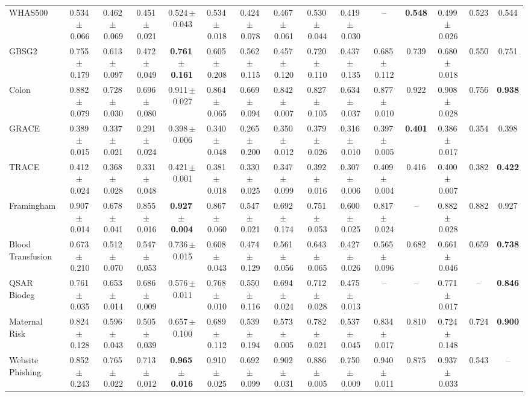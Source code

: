 \documentclass[8pt]{extarticle}
\begin{document}
\begin{longtable}{l*{14}{c}}
WHAS500 & 0.534\,$\pm$\,0.066 & 0.462\,$\pm$\,0.069 & 0.451\,$\pm$\,0.021 & 0.524\,$\pm$\,0.043 & 0.534\,$\pm$\,0.018 & 0.424\,$\pm$\,0.078 & 0.467\,$\pm$\,0.061 & 0.530\,$\pm$\,0.044 & 0.419\,$\pm$\,0.030 & -- & \textbf{0.548} & 0.499\,$\pm$\,0.026 & 0.523 & 0.544 \\
GBSG2 & 0.755\,$\pm$\,0.179 & 0.613\,$\pm$\,0.097 & 0.472\,$\pm$\,0.049 & \textbf{0.761\,$\pm$\,0.161} & 0.605\,$\pm$\,0.208 & 0.562\,$\pm$\,0.115 & 0.457\,$\pm$\,0.120 & 0.720\,$\pm$\,0.110 & 0.437\,$\pm$\,0.135 & 0.685\,$\pm$\,0.112 & 0.739 & 0.680\,$\pm$\,0.018 & 0.550 & 0.751 \\
Colon & 0.882\,$\pm$\,0.079 & 0.728\,$\pm$\,0.030 & 0.696\,$\pm$\,0.080 & 0.911\,$\pm$\,0.027 & 0.864\,$\pm$\,0.065 & 0.669\,$\pm$\,0.094 & 0.842\,$\pm$\,0.007 & 0.827\,$\pm$\,0.105 & 0.634\,$\pm$\,0.037 & 0.877\,$\pm$\,0.010 & 0.922 & 0.908\,$\pm$\,0.028 & 0.756 & \textbf{0.938} \\
GRACE & 0.389\,$\pm$\,0.015 & 0.337\,$\pm$\,0.021 & 0.291\,$\pm$\,0.024 & 0.398\,$\pm$\,0.006 & 0.340\,$\pm$\,0.048 & 0.265\,$\pm$\,0.200 & 0.350\,$\pm$\,0.012 & 0.379\,$\pm$\,0.026 & 0.316\,$\pm$\,0.010 & 0.397\,$\pm$\,0.005 & \textbf{0.401} & 0.386\,$\pm$\,0.017 & 0.354 & 0.398 \\
TRACE & 0.412\,$\pm$\,0.024 & 0.368\,$\pm$\,0.028 & 0.331\,$\pm$\,0.048 & 0.421\,$\pm$\,0.001 & 0.381\,$\pm$\,0.018 & 0.330\,$\pm$\,0.025 & 0.347\,$\pm$\,0.099 & 0.392\,$\pm$\,0.016 & 0.307\,$\pm$\,0.006 & 0.409\,$\pm$\,0.004 & 0.416 & 0.400\,$\pm$\,0.007 & 0.382 & \textbf{0.422} \\
Framingham & 0.907\,$\pm$\,0.014 & 0.678\,$\pm$\,0.041 & 0.855\,$\pm$\,0.016 & \textbf{0.927\,$\pm$\,0.004} & 0.867\,$\pm$\,0.060 & 0.547\,$\pm$\,0.021 & 0.692\,$\pm$\,0.174 & 0.751\,$\pm$\,0.053 & 0.600\,$\pm$\,0.025 & 0.817\,$\pm$\,0.024 & -- & 0.882\,$\pm$\,0.028 & 0.882 & 0.927 \\
Blood Transfusion & 0.673\,$\pm$\,0.210 & 0.512\,$\pm$\,0.070 & 0.547\,$\pm$\,0.053 & 0.736\,$\pm$\,0.015 & 0.608\,$\pm$\,0.043 & 0.474\,$\pm$\,0.129 & 0.561\,$\pm$\,0.056 & 0.643\,$\pm$\,0.065 & 0.427\,$\pm$\,0.026 & 0.565\,$\pm$\,0.096 & 0.682 & 0.661\,$\pm$\,0.046 & 0.659 & \textbf{0.738} \\
QSAR Biodeg & 0.761\,$\pm$\,0.035 & 0.653\,$\pm$\,0.014 & 0.686\,$\pm$\,0.009 & 0.576\,$\pm$\,0.011 & 0.768\,$\pm$\,0.010 & 0.550\,$\pm$\,0.116 & 0.694\,$\pm$\,0.024 & 0.712\,$\pm$\,0.028 & 0.475\,$\pm$\,0.013 & -- & -- & 0.771\,$\pm$\,0.017 & -- & \textbf{0.846} \\
Maternal Risk & 0.824\,$\pm$\,0.128 & 0.596\,$\pm$\,0.043 & 0.505\,$\pm$\,0.039 & 0.657\,$\pm$\,0.100 & 0.689\,$\pm$\,0.112 & 0.539\,$\pm$\,0.194 & 0.573\,$\pm$\,0.005 & 0.782\,$\pm$\,0.021 & 0.537\,$\pm$\,0.045 & 0.834\,$\pm$\,0.017 & 0.810 & 0.724\,$\pm$\,0.148 & 0.724 & \textbf{0.900} \\
Website Phishing & 0.852\,$\pm$\,0.243 & 0.765\,$\pm$\,0.022 & 0.713\,$\pm$\,0.012 & \textbf{0.965\,$\pm$\,0.016} & 0.910\,$\pm$\,0.025 & 0.692\,$\pm$\,0.099 & 0.902\,$\pm$\,0.031 & 0.886\,$\pm$\,0.005 & 0.750\,$\pm$\,0.009 & 0.940\,$\pm$\,0.011 & 0.875 & 0.937\,$\pm$\,0.033 & 0.543 & -- \\
\end{longtable}
\end{document}
